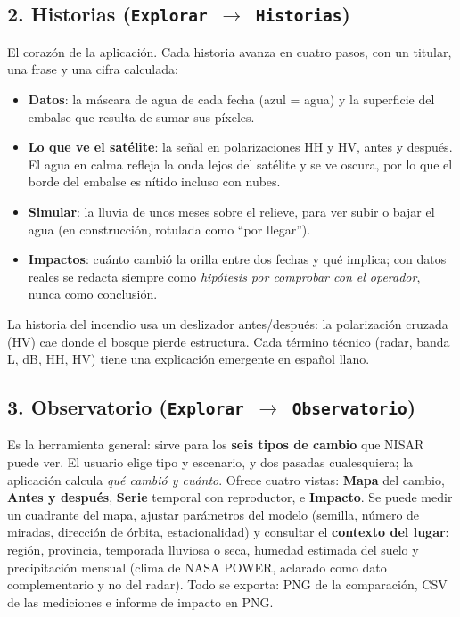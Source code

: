 \documentclass[11pt,a4paper]{article}
\begin{document}
\subsection*{2. Historias (\texttt{Explorar $\rightarrow$ Historias})}
El corazón de la aplicación. Cada historia avanza en cuatro pasos, con un titular, una frase y una cifra calculada:
\begin{itemize}
\item \textbf{Datos}: la máscara de agua de cada fecha (azul = agua) y la superficie del embalse que resulta de sumar sus píxeles.
\item \textbf{Lo que ve el satélite}: la señal en polarizaciones HH y HV, antes y después. El agua en calma refleja la onda lejos del satélite y se ve oscura, por lo que el borde del embalse es nítido incluso con nubes.
\item \textbf{Simular}: la lluvia de unos meses sobre el relieve, para ver subir o bajar el agua (en construcción, rotulada como ``por llegar'').
\item \textbf{Impactos}: cuánto cambió la orilla entre dos fechas y qué implica; con datos reales se redacta siempre como \emph{hipótesis por comprobar con el operador}, nunca como conclusión.
\end{itemize}
La historia del incendio usa un deslizador antes/después: la polarización cruzada (HV) cae donde el bosque pierde estructura. Cada término técnico (radar, banda L, dB, HH, HV) tiene una explicación emergente en español llano.

\subsection*{3. Observatorio (\texttt{Explorar $\rightarrow$ Observatorio})}
Es la herramienta general: sirve para los \textbf{seis tipos de cambio} que NISAR puede ver. El usuario elige tipo y escenario, y dos pasadas cualesquiera; la aplicación calcula \emph{qué cambió y cuánto}. Ofrece cuatro vistas: \textbf{Mapa} del cambio, \textbf{Antes y después}, \textbf{Serie} temporal con reproductor, e \textbf{Impacto}. Se puede medir un cuadrante del mapa, ajustar parámetros del modelo (semilla, número de miradas, dirección de órbita, estacionalidad) y consultar el \textbf{contexto del lugar}: región, provincia, temporada lluviosa o seca, humedad estimada del suelo y precipitación mensual (clima de NASA POWER, aclarado como dato complementario y no del radar). Todo se exporta: PNG de la comparación, CSV de las mediciones e informe de impacto en PNG.
\end{document}
